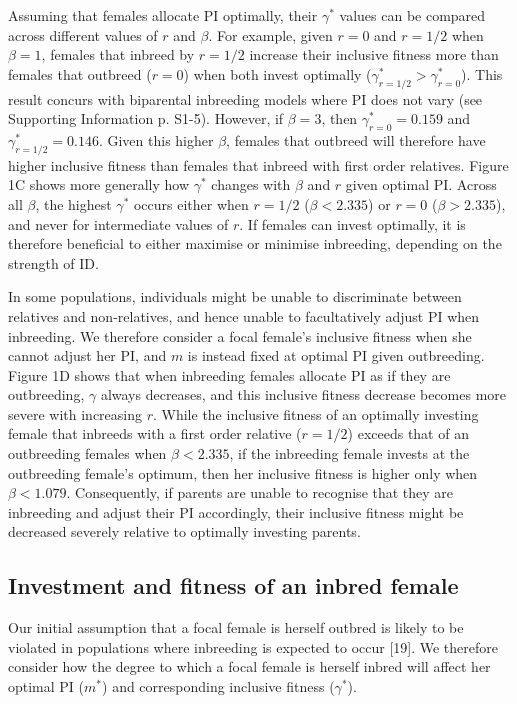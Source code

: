 \documentclass[12pt]{article}
\begin{document}
Assuming that females allocate PI optimally, their $\gamma^{*}$ values can be compared across different values of $r$ and $\beta$. For example, given $r=0$ and $r=1/2$ when $\beta=1$, females that inbreed by $r=1/2$ increase their inclusive fitness more than females that outbreed ($r=0$) when both invest optimally ($\gamma^{*}_{r=1/2}>\gamma^{*}_{r=0}$). This result concurs with biparental inbreeding models where PI does not vary (see Supporting Information p. S1-5). However, if $\beta=3$, then $\gamma^{*}_{r=0}=0.159$ and $\gamma^{*}_{r=1/2}=0.146$. Given this higher $\beta$, females that outbreed will therefore have higher inclusive fitness than females that inbreed with first order relatives. Figure 1C shows more generally how $\gamma^{*}$ changes with $\beta$ and $r$ given optimal PI. Across all $\beta$, the highest $\gamma^{*}$ occurs either when $r=1/2$ ($\beta < 2.335$) or $r=0$ ($\beta > 2.335$), and never for intermediate values of $r$. If females can invest optimally, it is therefore beneficial to either maximise or minimise inbreeding, depending on the strength of ID.

In some populations, individuals might be unable to discriminate between relatives and non-relatives, and hence unable to facultatively adjust PI when inbreeding. We therefore consider a focal female's inclusive fitness when she cannot adjust her PI, and $m$ is instead fixed at optimal PI given outbreeding. Figure 1D shows that when inbreeding females allocate PI as if they are outbreeding, $\gamma$ always decreases, and this inclusive fitness decrease becomes more severe with increasing $r$. While the inclusive fitness of an optimally investing female that inbreeds with a first order relative ($r=1/2$) exceeds that of an outbreeding females when $\beta < 2.335$, if the inbreeding female invests at the outbreeding female's optimum, then her inclusive fitness is higher only when $\beta < 1.079$. Consequently, if parents are unable to recognise that they are inbreeding and adjust their PI accordingly, their inclusive fitness might be decreased severely relative to optimally investing parents.


\subsection*{Investment and fitness of an inbred female}

Our initial assumption that a focal female is herself outbred is likely to be violated in populations where inbreeding is expected to occur [19]. We therefore consider how the degree to which a focal female is herself inbred will affect her optimal PI ($m^{*}$) and corresponding inclusive fitness ($\gamma^{*}$).
\end{document}
